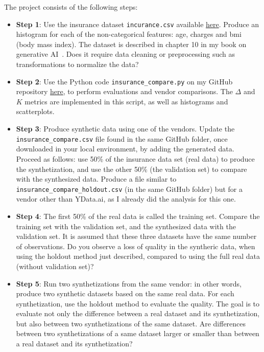 \documentclass[oneside,10pt]{book}
\begin{document}
\noindent The project consists of the following steps: \vspace{1ex}
\begin{itemize}
\item[] {\bf Step 1}:  Use the insurance dataset \texttt{incurance.csv} available \href{https://github.com/VincentGranville/Main}{here}. Produce an histogram for each of the non-categorical features: age, charges and bmi (body mass index). The dataset is described in chapter 10 in my book on generative AI~\cite{vgelsevier}. Does it require data cleaning or preprocessing such as transformations to normalize the data?
\vspace{1ex}
\item[] {\bf Step 2}:  Use the Python code \texttt{insurance\_compare.py} on my GitHub repository 
\href{https://github.com/VincentGranville/Main/blob/main/insurance_compare.py}{here}, to perform evaluations and vendor comparisons.
The $\Delta$ and $K$ metrics are implemented in this script, as well as histograms and scatterplots.
\vspace{1ex}
\item[] {\bf Step 3}: Produce synthetic data using one of the vendors.
  Update the \texttt{insurance\_compare.csv} file found in the same GitHub folder, once downloaded in your local environment,  by adding the generated data. 
Proceed as follows: use 50\% of the insurance data set (real data) to produce the synthetization, and use the other 50\% (the validation set) to compare with the synthesized data. Produce a file similar to 
\texttt{insurance\_compare\_holdout.csv} (in the same GitHub folder) but for a vendor other than YData.ai, as I already did the analysis for this one.
\item[] {\bf Step 4}: The first 50\% of the real data is called the training set. Compare the training set with the validation set, and the synthesized data with the validation set. It is assumed that these three datasets have the same number of observations. Do you observe a loss of quality in the syntheric data, when using the holdout method just described, compared to using the full real data (without validation set)? \vspace{1ex}
\item[] {\bf Step 5}: Run two synthetizations from the same vendor: in other words, produce two synthetic datasets based on the same real data. 
 For each synthetization, use the holdout method to evaluate the quality. The goal is to evaluate not only the difference between a real dataset and its synthetization, but also between two synthetizations of the same dataset.  Are differences between two synthetizations of a same dataset larger or smaller than between a real dataset and its synthetization?
\end{itemize}\vspace{1ex}
\end{document}
